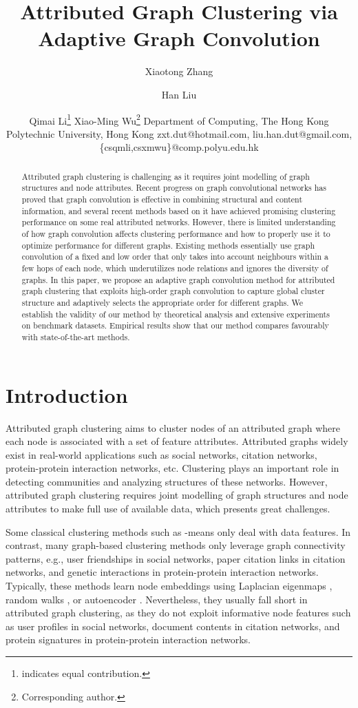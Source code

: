 \documentclass{article}
\title{Attributed Graph Clustering via Adaptive Graph Convolution}
\author{
Xiaotong Zhang
\and
Han Liu\and
Qimai Li\footnote{indicates equal contribution.}\And
Xiao-Ming Wu\thanks{Corresponding author.}
\affiliations
Department of Computing, The Hong Kong Polytechnic University, Hong Kong
\emails
zxt.dut@hotmail.com,
liu.han.dut@gmail.com,
\{csqmli,csxmwu\}@comp.polyu.edu.hk
}
\begin{document}
\maketitle

\begin{abstract}
Attributed graph clustering is challenging as it requires joint modelling of graph structures and node attributes. Recent progress on graph convolutional networks has proved that graph convolution is effective in combining structural and content information, and several recent methods based on it have achieved promising clustering performance on some real attributed networks. However, there is limited understanding of how graph convolution affects clustering performance and how to properly use it to optimize performance for different graphs. Existing methods essentially use graph convolution of a fixed and low order that only takes into account neighbours within a few hops of each node, which underutilizes node relations and ignores the diversity of graphs. In this paper, we propose an adaptive graph convolution method for attributed graph clustering that exploits high-order graph convolution to capture global cluster structure and adaptively selects the appropriate order for different graphs. We establish the validity of our method by theoretical analysis and extensive experiments on benchmark datasets. Empirical results show that our method compares favourably with state-of-the-art methods.
\end{abstract}


\section{Introduction}

Attributed graph clustering \cite{tkde/CaiZC18} aims to cluster nodes of an attributed graph where each node is associated with a set of feature attributes. Attributed graphs widely exist in real-world applications such as social networks, citation networks, protein-protein interaction networks, etc. Clustering plays an important role in detecting communities and analyzing structures of these networks. However, attributed graph clustering requires  joint modelling of graph structures and node attributes to make full use of available data, which presents great challenges.



Some classical clustering methods such as -means only deal with data features. In contrast, many graph-based clustering methods \cite{schaeffer2007graph} only leverage graph connectivity patterns, e.g., user friendships in social networks, paper citation links in citation networks, and genetic interactions in protein-protein interaction networks. Typically, these methods learn node embeddings using Laplacian eigenmaps \cite{newman2006finding}, random walks \cite{perozzi2014deepwalk}, or autoencoder \cite{wang2016structural}. Nevertheless, they usually fall short in attributed graph clustering, as they do not exploit informative node features such as user profiles in social networks, document contents in citation networks, and protein signatures in protein-protein interaction networks.
\end{document}
